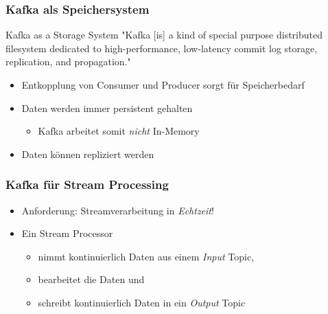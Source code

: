 %

\begin{frame}
\frametitle{Kafka als Speichersystem}

\begin{block}{Kafka as a Storage System}
	"Kafka [is] a kind of special purpose distributed filesystem dedicated to high-performance, low-latency commit log storage, replication, and propagation." \cite{Kafka}
\end{block}


\begin{itemize}
	\item Entkopplung von Consumer und Producer sorgt für Speicherbedarf
	\item Daten werden immer persistent gehalten
	\begin{itemize}
		\item Kafka arbeitet somit \textit{nicht} In-Memory
	\end{itemize}
	\item Daten können repliziert werden
\end{itemize}
\end{frame}

\begin{frame}
\frametitle{Kafka für Stream Processing}

\begin{itemize}
	\item Anforderung: Streamverarbeitung in \textit{Echtzeit}!
	\item Ein Stream Processor
	\begin{itemize}
		\item nimmt kontinuierlich Daten aus einem \textit{Input} Topic,
		\item bearbeitet die Daten und
		\item schreibt kontinuierlich Daten in ein \textit{Output} Topic 
	\end{itemize}
\end{itemize}

\end{frame}



